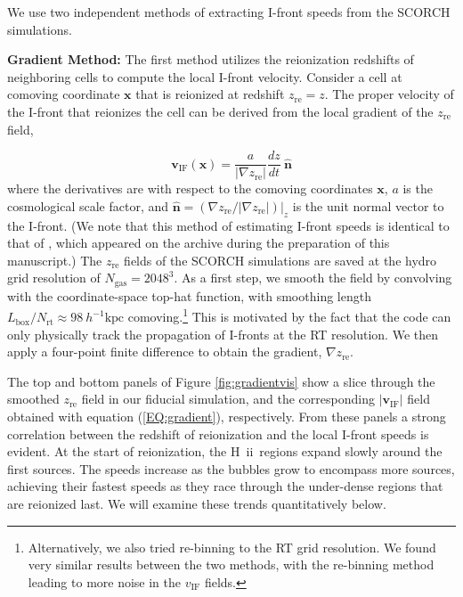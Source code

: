 \documentclass[twocolumn]{aastex62}
\newcommand{\zreion}{z_{\mathrm{re}}}
\newcommand{\HII}{H{\sc~ii}}
\newcommand{\vIF}{v_{\mathrm{IF}}}
\newcommand{\kpc}{\mathrm{kpc}}
\begin{document}
We use two independent methods of extracting I-front speeds from the SCORCH simulations.

\smallskip
\noindent
{\bf Gradient Method:} The first method utilizes the reionization redshifts of neighboring cells to compute the local I-front velocity.  Consider a cell at comoving coordinate $\mathbf{x}$ that is reionized at redshift $\zreion = z$.  The proper velocity of the I-front that reionizes the cell can be derived from the local gradient of the $\zreion$ field, 

\begin{equation}
 \mathbf{ \vIF}(\mathbf{x}) = \frac{a}{|\nabla \zreion|} \frac{dz}{dt}~\mathbf{\hat{n}}
 \label{EQ:gradient}
\end{equation}
where the derivatives are with respect to the comoving coordinates $\mathbf{x}$, $a$ is the cosmological scale factor, and $\mathbf{\hat{n}} = \left. (\nabla \zreion/|\nabla \zreion| )\right|_z$ is the unit normal vector to the I-front. (We note that this method of estimating I-front speeds is identical to that of \citealt{2018arXiv180301634D}, which appeared on the archive during the preparation of this manuscript.)  The $\zreion$ fields of the SCORCH simulations are saved at the hydro grid resolution of $N_{\mathrm{gas}}=2048^3$.  As a first step, we smooth the field by convolving with the coordinate-space top-hat function, with smoothing length $L_{\mathrm{box}}/N_{\mathrm{rt}} \approx 98~h^{-1}\kpc$ comoving.\footnote{Alternatively, we also tried re-binning to the RT grid resolution.  We found very similar results between the two methods, with the re-binning method leading to more noise in the $\vIF$ fields.}  This is motivated by the fact that the code can only physically track the propagation of I-fronts at the RT resolution.  We then apply a four-point finite difference to obtain the gradient, $\nabla \zreion$.  

The top and bottom panels of Figure \ref{fig:gradientvis} show a slice through the smoothed $\zreion$ field in our fiducial simulation, and the corresponding $|\mathbf{\vIF}|$ field obtained with equation (\ref{EQ:gradient}), respectively. From these panels a strong correlation between the redshift of reionization and the local I-front speeds is evident.  At the start of reionization, the \HII\ regions expand slowly around the first sources.  The speeds increase as the bubbles grow to encompass more sources, achieving their fastest speeds as they race through the under-dense regions that are reionized last.  We will examine these trends quantitatively below.       
\end{document}
